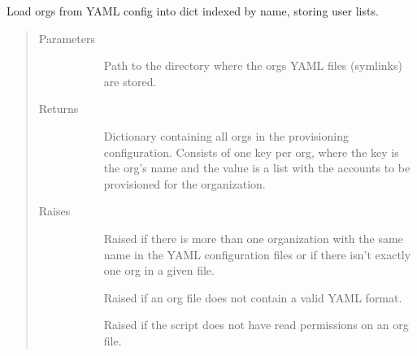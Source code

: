 \documentclass[letterpaper,10pt,english]{sphinxmanual}
\begin{document}
\begin{fulllineitems}
\label{\detokenize{accounts:gpAccounts.loadProvisionedOrgs}}
Load orgs from YAML config into dict indexed by name, storing user lists.
\begin{quote}\begin{description}
\item[{Parameters}] \leavevmode\begin{description}
\item[{}] \leavevmode{[}\sphinxtitleref{str}{]}
Path to the directory where the orgs YAML files (symlinks) are stored.

\end{description}

\item[{Returns}] \leavevmode\begin{description}
\item[{}] \leavevmode{[}\sphinxtitleref{dict}{]}
Dictionary containing all orgs in the provisioning configuration. Consists
of one key per org, where the key is the org’s name and the value is a list
with the accounts to be provisioned for the organization.

\end{description}

\item[{Raises}] \leavevmode\begin{description}
\item[{}] \leavevmode
Raised if there is more than one organization with the same name in the
YAML configuration files or if there isn’t exactly one org in a given
 file.

\item[{}] \leavevmode
Raised if an org file does not contain a valid YAML format.

\item[{}] \leavevmode
Raised if the script does not have read permissions on an org file.

\end{description}

\end{description}\end{quote}




{\hyperref[\detokenize{yamlUtility:yamlUtility.getYamlContent}]{}}



\end{fulllineitems}
\end{document}
